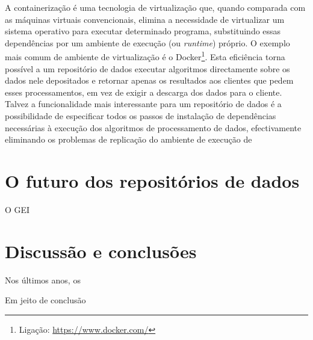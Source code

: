 \documentclass[sigconf,nonacm]{acmart}
\begin{document}
A containerização é uma tecnologia de virtualização que, quando comparada com as máquinas virtuais convencionais, elimina a necessidade de virtualizar um sistema operativo para executar determinado programa, substituindo essas dependências por um ambiente de execução (ou \textit{runtime}) próprio. O exemplo mais comum de ambiente de virtualização é o Docker\footnote{Ligação: \url{https://www.docker.com/}}. Esta eficiência torna possível a um repositório de dados executar algoritmos directamente sobre os dados nele depositados e retornar apenas os resultados aos clientes que pedem esses processamentos, em vez de exigir a descarga dos dados para o cliente. Talvez a funcionalidade mais interessante para um repositório de dados é a possibilidade de especificar todos os passos de instalação de dependências necessárias à execução dos algoritmos de processamento de dados, efectivamente eliminando os problemas de replicação do ambiente de execução de 

\section{O futuro dos repositórios de dados}

O GEI 

\section{Discussão e conclusões}

Nos últimos anos, os 

Em jeito de conclusão





\end{document}
